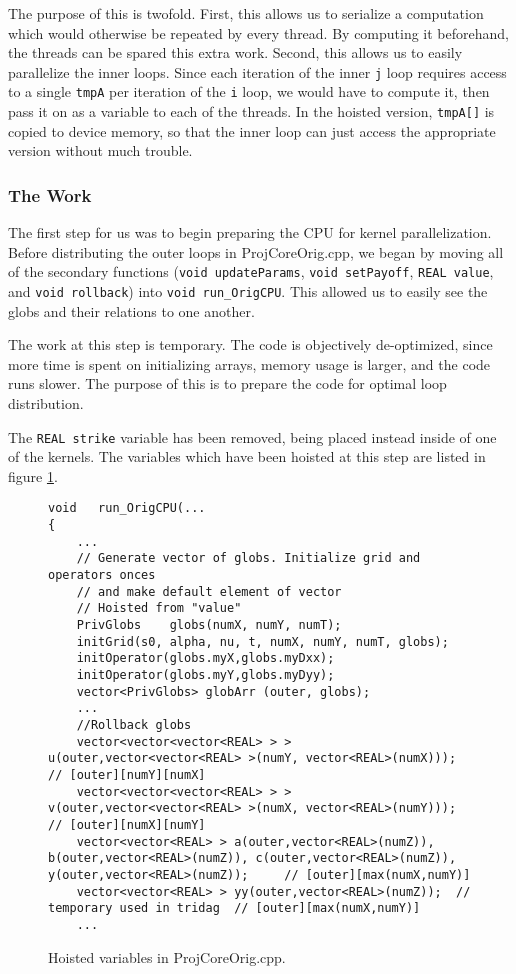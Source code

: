 \documentclass[]{report}
\begin{document}
The purpose of this is twofold. First, this allows us to serialize a computation which would otherwise be repeated by every thread. By computing it beforehand, the threads can be spared this extra work. Second, this allows us to easily parallelize the inner loops. Since each iteration of the inner \texttt{j} loop requires access to a single \texttt{tmpA} per iteration of the \texttt{i} loop, we would have to compute it, then pass it on as a variable to each of the threads. In the hoisted version, \texttt{tmpA[]} is copied to device memory, so that the inner loop can just access the appropriate version without much trouble.
\subsubsection{The Work}
The first step for us was to begin preparing the CPU for kernel parallelization. Before distributing the outer loops in ProjCoreOrig.cpp,
we began by moving all of the secondary functions (\texttt{void updateParams}, \texttt{void setPayoff}, \texttt{REAL value}, and \texttt{void rollback}) into \texttt{void run\_OrigCPU}. This allowed us to easily see the globs and their relations to one another.

The work at this step is temporary. The code is objectively de-optimized, since more time is spent on initializing arrays, memory usage is larger, and the code runs slower. The purpose of this is to prepare the code for optimal loop distribution.

The \texttt{REAL strike} variable has been removed, being placed instead inside of one of the kernels. The variables which have been hoisted at this step are listed in figure \ref{fig:globs}.
\begin{figure}[h]
\begin{lstlisting}
void   run_OrigCPU(...
{   
	...
	// Generate vector of globs. Initialize grid and operators onces
    // and make default element of vector
    // Hoisted from "value"
    PrivGlobs    globs(numX, numY, numT);
    initGrid(s0, alpha, nu, t, numX, numY, numT, globs);
    initOperator(globs.myX,globs.myDxx);
    initOperator(globs.myY,globs.myDyy);
    vector<PrivGlobs> globArr (outer, globs);
    ...
    //Rollback globs
    vector<vector<vector<REAL> > > u(outer,vector<vector<REAL> >(numY, vector<REAL>(numX)));   // [outer][numY][numX]
    vector<vector<vector<REAL> > > v(outer,vector<vector<REAL> >(numX, vector<REAL>(numY)));   // [outer][numX][numY]
    vector<vector<REAL> > a(outer,vector<REAL>(numZ)), b(outer,vector<REAL>(numZ)), c(outer,vector<REAL>(numZ)), y(outer,vector<REAL>(numZ));     // [outer][max(numX,numY)]
    vector<vector<REAL> > yy(outer,vector<REAL>(numZ));  // temporary used in tridag  // [outer][max(numX,numY)]
    ...
\end{lstlisting}
\caption{ \label{fig:globs} Hoisted variables in ProjCoreOrig.cpp. }
\end{figure}
\end{document}
